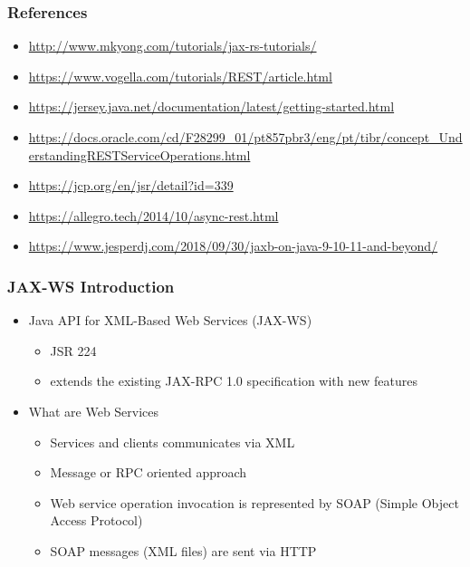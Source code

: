 \documentclass[10pt,xcolor=pdflatex]{beamer}
\begin{document}
\begin{frame}[containsverbatim]\frametitle{References}
\begin{footnotesize}
\begin{itemize}
  	\item \url{http://www.mkyong.com/tutorials/jax-rs-tutorials/}
    \item \url{https://www.vogella.com/tutorials/REST/article.html}
    \item \url{https://jersey.java.net/documentation/latest/getting-started.html}
    \item \url{https://docs.oracle.com/cd/F28299_01/pt857pbr3/eng/pt/tibr/concept_UnderstandingRESTServiceOperations.html}
    \item \url{https://jcp.org/en/jsr/detail?id=339}
    \item{\url{https://allegro.tech/2014/10/async-rest.html}}
    \item{\url{https://www.jesperdj.com/2018/09/30/jaxb-on-java-9-10-11-and-beyond/}}
\end{itemize}
\end{footnotesize}
\end{frame}



\begin{frame}[containsverbatim]\frametitle{JAX-WS Introduction}
\begin{itemize}
    \item Java\texttrademark{} API for XML-Based Web Services (JAX-WS)
      \begin{itemize}
          \item JSR 224
          \item extends the existing JAX-RPC 1.0 specification with new features
      \end{itemize}
	\item What are Web Services
	  \begin{itemize}
		\item Services and clients communicates via XML
		\item Message or RPC oriented approach
		\item Web service operation invocation is represented by SOAP (Simple Object Access Protocol)
		\item SOAP messages (XML files) are sent via HTTP
	  \end{itemize}
\end{itemize}
\end{frame}
\end{document}
